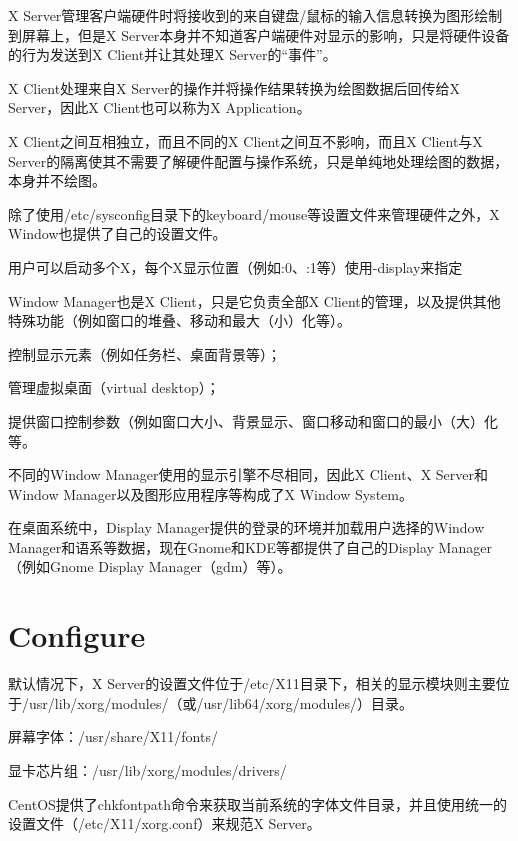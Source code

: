 X Server管理客户端硬件时将接收到的来自键盘/鼠标的输入信息转换为图形绘制到屏幕上，但是X Server本身并不知道客户端硬件对显示的影响，只是将硬件设备的行为发送到X Client并让其处理X Server的“事件”。

X Client处理来自X Server的操作并将操作结果转换为绘图数据后回传给X Server，因此X Client也可以称为X Application。

X Client之间互相独立，而且不同的X Client之间互不影响，而且X Client与X Server的隔离使其不需要了解硬件配置与操作系统，只是单纯地处理绘图的数据，本身并不绘图。

除了使用/etc/sysconfig目录下的keyboard/mouse等设置文件来管理硬件之外，X Window也提供了自己的设置文件。

用户可以启动多个X，每个X显示位置（例如:0、:1等）使用-display来指定


Window Manager也是X Client，只是它负责全部X Client的管理，以及提供其他特殊功能（例如窗口的堆叠、移动和最大（小）化等）。

\begin{compactitem}
\item 控制显示元素（例如任务栏、桌面背景等）；
\item 管理虚拟桌面（virtual desktop）；
\item 提供窗口控制参数（例如窗口大小、背景显示、窗口移动和窗口的最小（大）化等。
\end{compactitem}

不同的Window Manager使用的显示引擎不尽相同，因此X Client、X Server和Window Manager以及图形应用程序等构成了X Window System。

在桌面系统中，Display Manager提供的登录的环境并加载用户选择的Window Manager和语系等数据，现在Gnome和KDE等都提供了自己的Display Manager（例如Gnome Display Manager（gdm）等）。


\section{Configure}

默认情况下，X Server的设置文件位于/etc/X11目录下，相关的显示模块则主要位于/usr/lib/xorg/modules/（或/usr/lib64/xorg/modules/）目录。

\begin{compactitem}
\item 屏幕字体：/usr/share/X11/fonts/
\item 显卡芯片组：/usr/lib/xorg/modules/drivers/
\end{compactitem}

CentOS提供了chkfontpath命令来获取当前系统的字体文件目录，并且使用统一的设置文件（/etc/X11/xorg.conf）来规范X Server。

